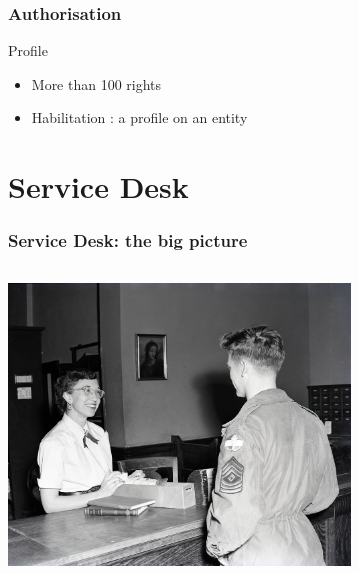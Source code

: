 \documentclass{beamer}
\begin{document}
\begin{frame}
\frametitle{Authorisation}
    \begin{block}{Profile}
        \begin{itemize}
            \item More than 100 rights
            \item Habilitation : a profile on an entity 
        \end{itemize}
    \end{block}
\end{frame}


\section{Service Desk}

\begin{frame}
\frametitle{Service Desk: the big picture}
\begin{columns}
\begin{column}{0.45\textwidth}
\includegraphics[height=7.5cm]{./pics/servicedesk.jpg}
\end{column}
\begin{column}{0.45\textwidth}
\end{column}
\end{columns}
\end{frame}
\end{document}
